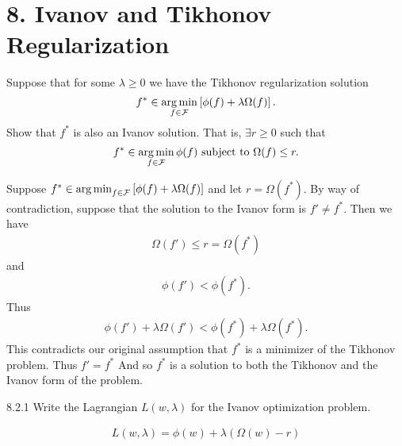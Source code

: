 \documentclass[12pt,letterpaper]{article}
\begin{document}
\newpage

\section*{8. Ivanov and Tikhonov Regularization}
\begin{problem}{8.1}
Suppose that for some $\lambda\ge0$ we have the Tikhonov regularization
solution
\begin{equation}
f^{*}\in\argmin_{f\in\cf}\left[\phi(f)+\lambda\Omega(f)\right].\label{eq:tikhonovReg}
\end{equation}
Show that $f^{*}$ is also an Ivanov solution. That is, $\exists r\ge0$
such that
\begin{equation}
f^{*}\in\argmin_{\substack{f\in\cf}
}\phi(f)\mbox{ subject to }\Omega(f)\le r.\label{eq:ivanovReg}
\end{equation}
\end{problem}
\begin{solution}{}
    Suppose $f^{*}\in\argmin_{f\in\cf}\left[\phi(f)+\lambda\Omega(f)\right]$ and let $r=\Omega(f^*)$. By way of contradiction, 
    suppose that the solution to the Ivanov form is $f'\neq f^*$. Then we have 
    \begin{align*}
        \Omega(f') \leq r = \Omega(f^*)
    \end{align*}
    and
    \begin{align*}
        \phi(f') < \phi(f^*).
    \end{align*}
    Thus
    \begin{align*}
        \phi(f') + \lambda \Omega(f') < \phi(f^*) + \lambda \Omega(f^*).
    \end{align*}
    This contradicts our original assumption that $f^*$ is a minimizer of the Tikhonov problem. Thus $f'=f^*$
    And so $f^*$ is a solution to both the Tikhonov and the Ivanov form of the problem.
\end{solution}
\newpage

\begin{problem}{8.2.1}
Write the Lagrangian $L(w,\lambda)$ for the Ivanov
optimization problem.
\end{problem}
\begin{solution}{}
    \begin{align*}
        L(w,\lambda)=\phi(w)+\lambda(\Omega(w)-r)
    \end{align*}
\end{solution}
$\,$
\end{document}

